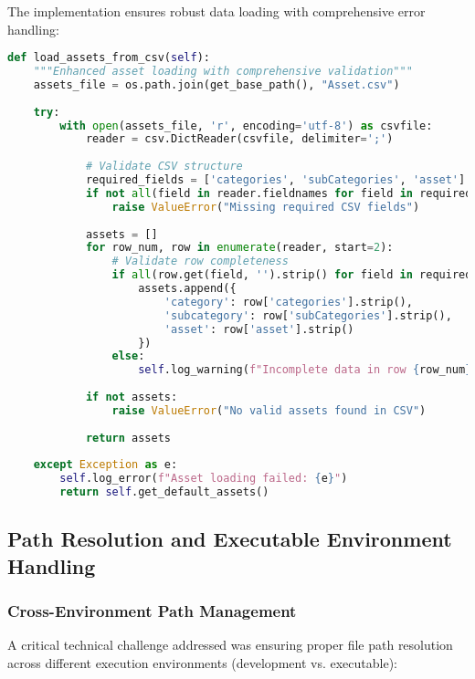 \documentclass[binding=0.6cm]{sapthesis}
\begin{document}
The implementation ensures robust data loading with comprehensive error handling:

\begin{lstlisting}[language=Python, caption=Robust Asset Loading with Validation]
def load_assets_from_csv(self):
    """Enhanced asset loading with comprehensive validation"""
    assets_file = os.path.join(get_base_path(), "Asset.csv")
    
    try:
        with open(assets_file, 'r', encoding='utf-8') as csvfile:
            reader = csv.DictReader(csvfile, delimiter=';')
            
            # Validate CSV structure
            required_fields = ['categories', 'subCategories', 'asset']
            if not all(field in reader.fieldnames for field in required_fields):
                raise ValueError("Missing required CSV fields")
            
            assets = []
            for row_num, row in enumerate(reader, start=2):
                # Validate row completeness
                if all(row.get(field, '').strip() for field in required_fields):
                    assets.append({
                        'category': row['categories'].strip(),
                        'subcategory': row['subCategories'].strip(),
                        'asset': row['asset'].strip()
                    })
                else:
                    self.log_warning(f"Incomplete data in row {row_num}")
            
            if not assets:
                raise ValueError("No valid assets found in CSV")
                
            return assets
            
    except Exception as e:
        self.log_error(f"Asset loading failed: {e}")
        return self.get_default_assets()
\end{lstlisting}

\subsection{Path Resolution and Executable Environment Handling}

\subsubsection{Cross-Environment Path Management}

A critical technical challenge addressed was ensuring proper file path resolution across different execution environments (development vs. executable):
\end{document}
